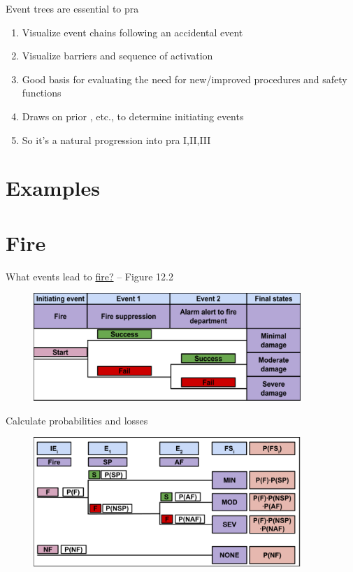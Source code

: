 \documentclass[aspectratio=1610,pdftex,dvipsnames,compress,xcolor={dvipsnames}]{beamer}
\newcommand{\acs}{\acrshort} %
\newcommand{\acsp}{\acrshortpl} %
\begin{document}
\begin{frame}{Event trees are essential to \acs{pra}}
    \begin{enumerate}[series=outerlist,topsep=0pt,itemsep=21pt,leftmargin=*,label=(\arabic*)]
        \item[]Visualize event chains following an accidental event
        \item[]Visualize barriers and sequence of activation
        \item[]Good basis for evaluating the need for new/improved procedures and safety functions
        \item[]Draws on prior \acsp{pra}, etc., to determine initiating events
        \item[]So it's a natural progression into \acs{pra} I,II,III
    \end{enumerate}
\end{frame}


\section{Examples}


\section{Fire}


\addtocounter{framenumber}{-2}
\begin{frame}{What events lead to \href{https://uidaho.pressbooks.pub/riskassessment/chapter/event-trees-2/}{fire?} -- Figure 12.2}
    \begin{figure}
        \centering
        \includegraphics[width=0.90\textwidth]{event.tree_fire.jpg}
    \end{figure}
\end{frame}


\begin{frame}{Calculate probabilities and losses}
    \begin{figure}
        \centering
        \includegraphics[width=0.90\textwidth]{event.tree_fire.loss.jpg}
    \end{figure}
\end{frame}
\end{document}

